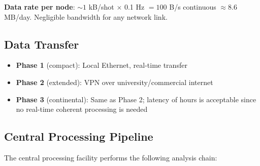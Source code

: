 \documentclass[12pt,a4paper]{article}
\begin{document}
\textbf{Data rate per node}: $\sim 1$ kB/shot $\times$ 0.1 Hz $= 100$ B/s
continuous $\approx 8.6$ MB/day. Negligible bandwidth for any network link.

\subsection{Data Transfer}

\begin{itemize}
\item \textbf{Phase 1} (compact): Local Ethernet, real-time transfer
\item \textbf{Phase 2} (extended): VPN over university/commercial internet
\item \textbf{Phase 3} (continental): Same as Phase 2; latency of hours
is acceptable since no real-time coherent processing is needed
\end{itemize}

\subsection{Central Processing Pipeline}

The central processing facility performs the following analysis chain:
\end{document}
